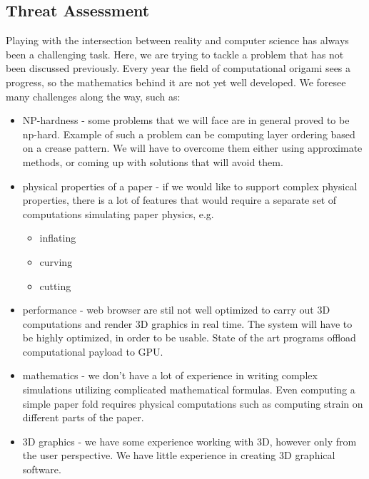 \subsection{Threat Assessment}

Playing with the intersection between reality and computer science has always
been a challenging task.
Here, we are trying to tackle a problem that has not been discussed previously.
Every year the field of computational origami sees a progress,
so the mathematics behind it are not yet well developed.
We foresee many challenges along the way, such as:

\begin{itemize}
	\item NP-hardness - some problems that we will face are in general proved to be np-hard.
		Example of such a problem can be computing layer ordering based on a crease pattern.
		We will have to overcome them either using approximate methods, or coming up with solutions that will avoid them.

	\item physical properties of a paper - if we would like to support complex physical properties,
		there is a lot of features that would require a separate set of computations simulating paper physics, e.g.
		\begin{itemize}
			\item inflating
			\item curving 
			\item cutting
		\end{itemize}

	\item performance - web browser are stil not well optimized to carry out 3D computations and render 3D graphics in real time.
		The system will have to be highly optimized, in order to be usable.
		State of the art programs offload computational payload to GPU.

	\item mathematics - we don't have a lot of experience in writing complex simulations utilizing complicated mathematical formulas.
		Even computing a simple paper fold requires physical computations such as computing strain on different parts of the paper.

	\item 3D graphics - we have some experience working with 3D, however only from the user perspective.
		We have little experience in creating 3D graphical software.

\end{itemize}

